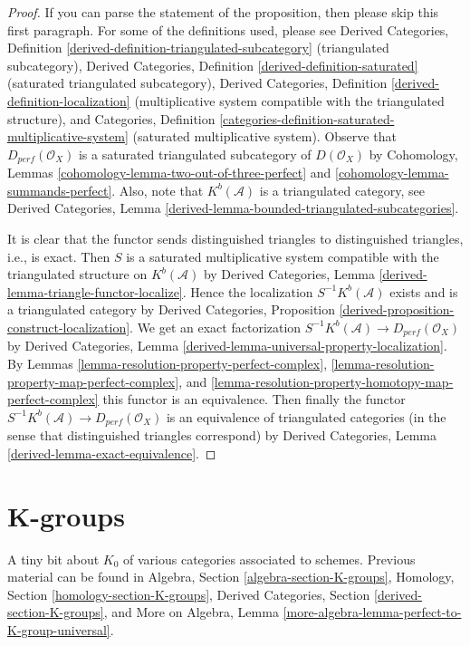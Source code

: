 \begin{proof}
If you can parse the statement of the proposition, then please skip this
first paragraph. For some of the definitions used, please see
Derived Categories, Definition
\ref{derived-definition-triangulated-subcategory}
(triangulated subcategory),
Derived Categories, Definition \ref{derived-definition-saturated}
(saturated triangulated subcategory),
Derived Categories, Definition \ref{derived-definition-localization}
(multiplicative system compatible with the triangulated structure), and
Categories,
Definition \ref{categories-definition-saturated-multiplicative-system}
(saturated multiplicative system).
Observe that $D_{perf}(\mathcal{O}_X)$ is a saturated triangulated subcategory
of $D(\mathcal{O}_X)$ by
Cohomology, Lemmas \ref{cohomology-lemma-two-out-of-three-perfect} and
\ref{cohomology-lemma-summands-perfect}. Also, note that
$K^b(\mathcal{A})$ is a triangulated category, see
Derived Categories, Lemma
\ref{derived-lemma-bounded-triangulated-subcategories}.

\medskip\noindent
It is clear that the functor sends distinguished triangles to
distinguished triangles, i.e., is exact. Then $S$ is a saturated
multiplicative system compatible with the triangulated structure
on $K^b(\mathcal{A})$ by
Derived Categories, Lemma \ref{derived-lemma-triangle-functor-localize}.
Hence the localization $S^{-1}K^b(\mathcal{A})$ exists and is
a triangulated category by
Derived Categories, Proposition
\ref{derived-proposition-construct-localization}.
We get an exact factorization
$S^{-1}K^b(\mathcal{A}) \to D_{perf}(\mathcal{O}_X)$ by
Derived Categories, Lemma
\ref{derived-lemma-universal-property-localization}.
By Lemmas \ref{lemma-resolution-property-perfect-complex},
\ref{lemma-resolution-property-map-perfect-complex}, and
\ref{lemma-resolution-property-homotopy-map-perfect-complex}
this functor is an equivalence. Then finally the functor
$S^{-1}K^b(\mathcal{A}) \to D_{perf}(\mathcal{O}_X)$
is an equivalence of triangulated categories (in the sense that
distinguished triangles correspond) by
Derived Categories, Lemma \ref{derived-lemma-exact-equivalence}.
\end{proof}






\section{K-groups}
\label{section-K-groups}

\noindent
A tiny bit about $K_0$ of various categories associated to schemes.
Previous material can be found in
Algebra, Section \ref{algebra-section-K-groups},
Homology, Section \ref{homology-section-K-groups},
Derived Categories, Section \ref{derived-section-K-groups}, and
More on Algebra, Lemma \ref{more-algebra-lemma-perfect-to-K-group-universal}.

